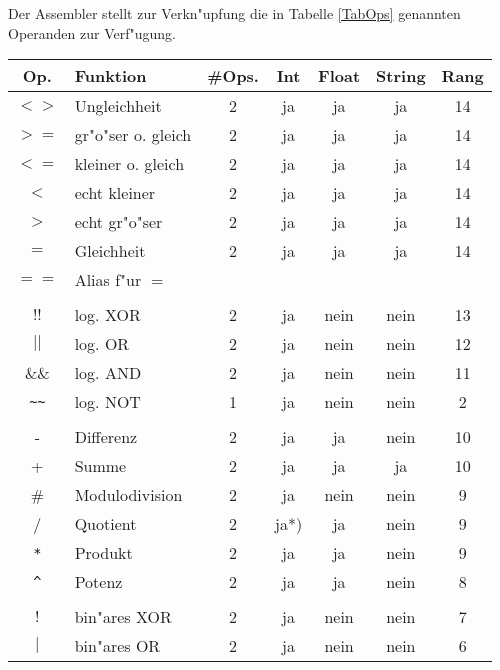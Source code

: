 \documentclass[12pt,a4paper,twoside]{report}
\begin{document}
Der Assembler stellt zur Verkn"upfung die in Tabelle \ref{TabOps} genannten
Operanden zur Verf"ugung.
\begin{table*}[htbp]
\begin{center}\begin{tabular}{|c|l|c|c|c|c|c|}
\hline
Op. & Funktion & \#Ops. & Int & Float & String & Rang \\
\hline
\hline
$<>$        & Ungleichheit         & 2 & ja   & ja   & ja   & 14 \\
$>=$        & gr"o"ser o. gleich   & 2 & ja   & ja   & ja   & 14 \\
$<=$        & kleiner o. gleich    & 2 & ja   & ja   & ja   & 14 \\
$<$         & echt kleiner         & 2 & ja   & ja   & ja   & 14 \\
$>$         & echt gr"o"ser        & 2 & ja   & ja   & ja   & 14 \\
$=$         & Gleichheit           & 2 & ja   & ja   & ja   & 14 \\
$==$        & Alias f"ur $=$       &   &      &      &      &    \\
            & & & & & &  \\
$!!$        & log. XOR             & 2 & ja   & nein & nein & 13 \\
$||$        & log. OR              & 2 & ja   & nein & nein & 12 \\
\&\&        & log. AND             & 2 & ja   & nein & nein & 11 \\
\verb! ~~ ! & log. NOT             & 1 & ja   & nein & nein & 2 \\
            & & & & & &  \\
-           & Differenz            & 2 & ja   & ja   & nein & 10 \\
+           & Summe                & 2 & ja   & ja   & ja   & 10 \\
\#          & Modulodivision       & 2 & ja   & nein & nein & 9 \\
/           & Quotient             & 2 & ja*) & ja   & nein & 9 \\
\verb! * !  & Produkt              & 2 & ja   & ja   & nein & 9 \\
\verb! ^ !  & Potenz               & 2 & ja   & ja   & nein & 8 \\
            & & & & & &  \\
$!$         & bin"ares XOR         & 2 & ja   & nein & nein & 7 \\
$|$         & bin"ares OR          & 2 & ja   & nein & nein & 6 \\

\end{tabular}
\end{center}
\end{table*}
\end{document}
